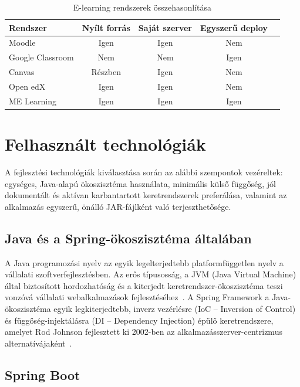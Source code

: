 \begin{table}[H]
\centering
\caption{E-learning rendszerek összehasonlítása}
\label{tab:lms_comparison}
\begin{tabular}{|l|c|c|c|c|}
\hline
\textbf{Rendszer} & \textbf{Nyílt forrás} & \textbf{Saját szerver} & \textbf{Egyszerű deploy} \\
\hline
Moodle       & Igen    & Igen & Nem   \\
Google Classroom & Nem & Nem  & Igen  \\
Canvas       & Részben & Igen & Nem   \\
Open edX     & Igen    & Igen & Nem   \\
ME Learning  & Igen    & Igen & Igen  \\
\hline
\end{tabular}
\end{table}

\section{Felhasznált technológiák}

A fejlesztési technológiák kiválasztása során az alábbi szempontok vezéreltek: egységes, Java-alapú ökoszisztéma használata, minimális külső függőség, jól dokumentált és aktívan karbantartott keretrendszerek preferálása, valamint az alkalmazás egyszerű, önálló JAR-fájlként való terjeszthetősége.

\subsection{Java és a Spring-ökoszisztéma általában}

A Java programozási nyelv az egyik legelterjedtebb platformfüggetlen nyelv a vállalati szoftverfejlesztésben. Az erős típusosság, a JVM (Java Virtual Machine) által biztosított hordozhatóság és a kiterjedt keretrendszer-ökoszisztéma teszi vonzóvá vállalati webalkalmazások fejlesztéséhez~\cite{eckel2006java}. A Spring Framework a Java-ökoszisztéma egyik legkiterjedtebb, inverz vezérlésre (IoC – Inversion of Control) és függőség-injektálásra (DI – Dependency Injection) épülő keretrendszere, amelyet Rod Johnson fejlesztett ki 2002-ben az alkalmazásszerver-centrizmus alternatívájaként~\cite{johnson2004j2ee}.

\subsection{Spring Boot}

